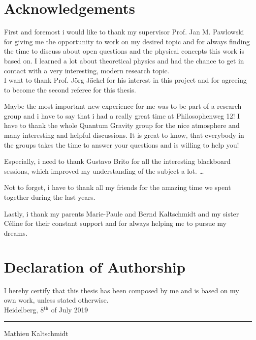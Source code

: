 \thispagestyle{plain}
\section*{Acknowledgements}
First and foremost i would like to thank my supervisor Prof. Jan M. Pawlowski for giving me the opportunity to work on my desired topic and for always finding the time to discuss about open questions and the physical concepts this work is based on. I learned a lot about theoretical physics and had the chance to get in contact with a very interesting, modern research topic. \\

I want to thank Prof. J\"org J\"ackel for his interest in this project and for agreeing to become the second referee for this thesis.


Maybe the most important new experience for me was to be part of a research group and i have to say that i had a really great time at Philosophenweg 12! I have to thank the whole Quantum Gravity group for the nice atmosphere and many interesting and helpful discussions. It is great to know, that everybody in the groups takes the time to answer your questions and is willing to help you!  

  Especially, i need  to thank Gustavo Brito for all the interesting blackboard sessions, which improved  my understanding of the subject a lot. \dots 


Not to forget, i have to thank all my friends for the amazing time we spent together during the last years.

Lastly, i thank my parents Marie-Paule and Bernd Kaltschmidt and my sister C\'{e}line for their constant support and for always helping me to pursue my dreams.  
 

\section*{Declaration of Authorship}
I hereby certify that this thesis has been composed by me and is based on my own work, unless stated otherwise.\\

Heidelberg, 8$^{\mathrm{th}}$ of July 2019 \hfill \rule{60mm}{.15mm} \par \vspace{-0.4cm}
\hfill Mathieu Kaltschmidt

